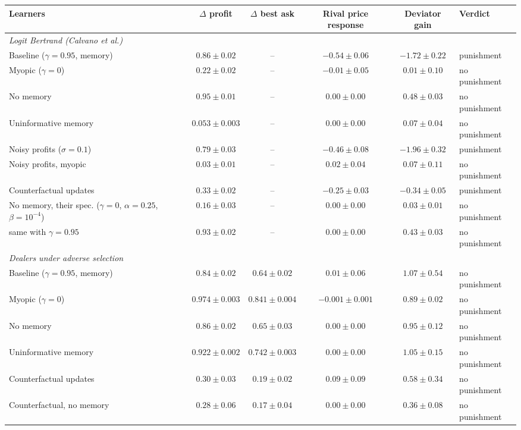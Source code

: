 \begin{tabular}{lccccl}
\toprule
Learners & $\Delta$ profit & $\Delta$ best ask & Rival price response & Deviator gain & Verdict \\
\midrule
\multicolumn{6}{l}{\emph{Logit Bertrand (Calvano et al.)}} \\
\quad Baseline ($\gamma=0.95$, memory) & $0.86 \pm 0.02$ & -- & $-0.54 \pm 0.06$ & $-1.72 \pm 0.22$ & punishment \\
\quad Myopic ($\gamma=0$) & $0.22 \pm 0.02$ & -- & $-0.01 \pm 0.05$ & $0.01 \pm 0.10$ & no punishment \\
\quad No memory & $0.95 \pm 0.01$ & -- & $0.00 \pm 0.00$ & $0.48 \pm 0.03$ & no punishment \\
\quad Uninformative memory & $0.053 \pm 0.003$ & -- & $0.00 \pm 0.00$ & $0.07 \pm 0.04$ & no punishment \\
\quad Noisy profits ($\sigma=0.1$) & $0.79 \pm 0.03$ & -- & $-0.46 \pm 0.08$ & $-1.96 \pm 0.32$ & punishment \\
\quad Noisy profits, myopic & $0.03 \pm 0.01$ & -- & $0.02 \pm 0.04$ & $0.07 \pm 0.11$ & no punishment \\
\quad Counterfactual updates & $0.33 \pm 0.02$ & -- & $-0.25 \pm 0.03$ & $-0.34 \pm 0.05$ & punishment \\
\quad No memory, their spec. ($\gamma=0$, $\alpha=0.25$, $\beta=10^{-4}$) & $0.16 \pm 0.03$ & -- & $0.00 \pm 0.00$ & $0.03 \pm 0.01$ & no punishment \\
\quad \quad same with $\gamma=0.95$ & $0.93 \pm 0.02$ & -- & $0.00 \pm 0.00$ & $0.43 \pm 0.03$ & no punishment \\
\multicolumn{6}{l}{\emph{Dealers under adverse selection}} \\
\quad Baseline ($\gamma=0.95$, memory) & $0.84 \pm 0.02$ & $0.64 \pm 0.02$ & $0.01 \pm 0.06$ & $1.07 \pm 0.54$ & no punishment \\
\quad Myopic ($\gamma=0$) & $0.974 \pm 0.003$ & $0.841 \pm 0.004$ & $-0.001 \pm 0.001$ & $0.89 \pm 0.02$ & no punishment \\
\quad No memory & $0.86 \pm 0.02$ & $0.65 \pm 0.03$ & $0.00 \pm 0.00$ & $0.95 \pm 0.12$ & no punishment \\
\quad Uninformative memory & $0.922 \pm 0.002$ & $0.742 \pm 0.003$ & $0.00 \pm 0.00$ & $1.05 \pm 0.15$ & no punishment \\
\quad Counterfactual updates & $0.30 \pm 0.03$ & $0.19 \pm 0.02$ & $0.09 \pm 0.09$ & $0.58 \pm 0.34$ & no punishment \\
\quad Counterfactual, no memory & $0.28 \pm 0.06$ & $0.17 \pm 0.04$ & $0.00 \pm 0.00$ & $0.36 \pm 0.08$ & no punishment \\
\bottomrule
\end{tabular}